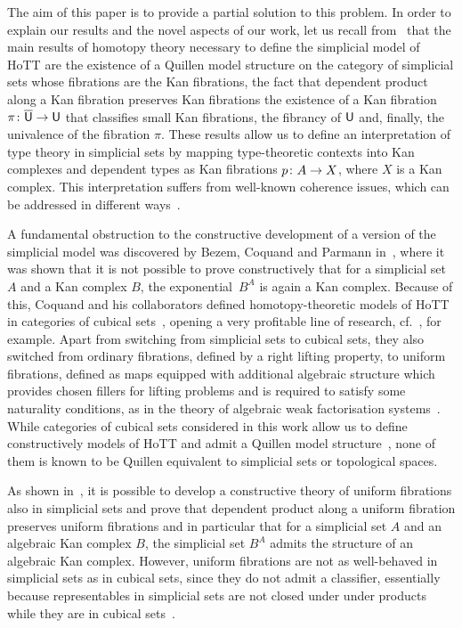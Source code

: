 \documentclass[reqno,10pt,a4paper,oneside,draft]{amsart}
\begin{document}
The aim of this paper is to provide a partial solution to this problem.  In order to
explain our results and the novel aspects of our work, let us recall from~\cite{voevodsky-simplicial-model} that the main results of  homotopy theory necessary 
to define the simplicial model of HoTT are 
the existence of a Quillen
model structure on the category of simplicial sets whose fibrations are the Kan fibrations, 
 the fact that dependent product along a Kan fibration preserves Kan fibrations 
 the existence of a Kan fibration $\pi \colon \overline{\mathsf{U}} \to \mathsf{U}$ that classifies small Kan fibrations, 
the fibrancy of $\mathsf{U}$ and, finally, the univalence of the fibration $\pi$. These results
allow us to define an interpretation of type theory in simplicial sets by mapping type-theoretic contexts
into Kan complexes and dependent types as Kan fibrations $p  \colon A \to X$, where
$X$ is a Kan complex. This interpretation suffers from well-known coherence issues,
which can be addressed in different ways~\cite{voevodsky-simplicial-model,LumsdaineP:locuoc}.



A fundamental obstruction to the constructive development of a version of the simplicial model was discovered by
Bezem, Coquand and Parmann in~\cite{coquand-non-constructivity-kan}, where it was shown that
it is not possible to prove constructively that for a simplicial set $A$ and a
Kan complex $B$, the exponential~$B^A$ is again a Kan complex.
Because of this, Coquand and his collaborators  defined homotopy-theoretic models of HoTT in categories of cubical sets~\cite{coquand-cubical-sets}, opening a very profitable line of research, cf.~\cite{awodey-cubical,PittsAM:aximct}, for example. Apart from switching 
from simplicial sets to cubical sets, they also switched from ordinary fibrations, defined by a right lifting property,
to uniform fibrations, defined as maps equipped with additional algebraic structure which provides
chosen fillers for lifting problems and is required to satisfy some naturality conditions, as in the
theory of algebraic weak factorisation systems~\cite{garner:small-object-argument}. While 
categories of cubical sets considered in this work allow us to define constructively models of HoTT 
and admit a Quillen
model structure~\cite{SattlerC:equepu}, none of them
 is known to be Quillen equivalent to simplicial sets or topological spaces.

As shown in~\cite{gambino2017frobenius}, it is possible to develop  a constructive theory of uniform fibrations
also in simplicial sets and prove that dependent product along a uniform fibration preserves
uniform fibrations and in particular that for a simplicial set $A$ and an 
 algebraic Kan complex $B$, the simplicial set $B^A$ admits the structure of an algebraic Kan complex. However,  uniform fibrations
are not as well-behaved in simplicial sets as in cubical sets,
since they do not admit a classifier, essentially because 
representables  in simplicial sets are not closed under under products while they are in cubical sets~\cite{SattlerC:faiaut}. 
\end{document}
